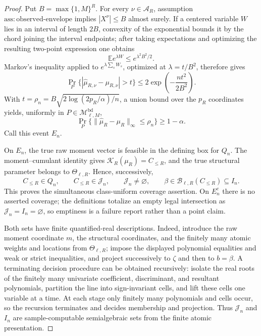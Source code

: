 \documentclass{article}
\begin{document}
\begin{proof}
Put \(B=\max\{1,M\}^R\).  For every \(\nu\in\mathcal A_R\), assumption \(\mathrm{ass:observed\mbox{-}envelope}\) implies \(|X^\nu|\le B\) almost surely.  If a centered variable \(W\) lies in an interval of length \(2B\), convexity of the exponential bounds it by the chord joining the interval endpoints; after taking expectations and optimizing the resulting two-point expression one obtains
\[
 \mathbb E e^{\lambda W}\le e^{\lambda^2B^2/2}.
\]
Markov's inequality applied to \(e^{\lambda\sum_sW_s}\), optimized at \(\lambda=t/B^2\), therefore gives
\[
 \Pr_P\{|\widehat\mu_{R,\nu}-\mu_{R,\nu}|>t\}
 \le2\exp\!\left(-\frac{nt^2}{2B^2}\right).
\]
With \(t=\rho_n=B\sqrt{2\log(2p_R/\alpha)/n}\), a union bound over the \(p_R\) coordinates yields, uniformly in \(P\in\mathcal M^{\mathrm{bd}}_{\ell,M}\),
\[
 \Pr_P\{\|\widehat\mu_R-\mu_R\|_\infty\le\rho_n\}\ge1-\alpha.
\]
Call this event \(E_n\).

On \(E_n\), the true raw moment vector is feasible in the defining box for \(Q_n\).  The moment--cumulant identity gives \(\mathcal K_R(\mu_R)=C_{\le R}\), and the true structural parameter belongs to \(\Theta_{\ell,R}\).  Hence, successively,
\[
 C_{\le R}\in Q_n,\qquad
 C_{\le R}\in\mathcal J_n,\qquad
 \mathcal J_n\ne\varnothing,\qquad
 \beta\in\mathcal B_{\ell,R}(C_{\le R})\subseteq I_n.
\]
This proves the simultaneous class-uniform coverage assertion.  On \(E_n^c\) there is no asserted coverage; the definitions totalize an empty legal intersection as \(\mathcal J_n=I_n=\varnothing\), so emptiness is a failure report rather than a point claim.

Both sets have finite quantified-real descriptions.  Indeed, introduce the raw moment coordinate \(m\), the structural coordinates, and the finitely many atomic weights and locations from \(\Theta_{\ell,R}\); impose the displayed polynomial equalities and weak or strict inequalities, and project successively to \(\zeta\) and then to \(b=\beta\).  A terminating decision procedure can be obtained recursively: isolate the real roots of the finitely many univariate coefficient, discriminant, and resultant polynomials, partition the line into sign-invariant cells, and lift these cells one variable at a time.  At each stage only finitely many polynomials and cells occur, so the recursion terminates and decides membership and projection.  Thus \(\mathcal J_n\) and \(I_n\) are sample-computable semialgebraic sets from the finite atomic presentation.


\end{proof}
\end{document}
